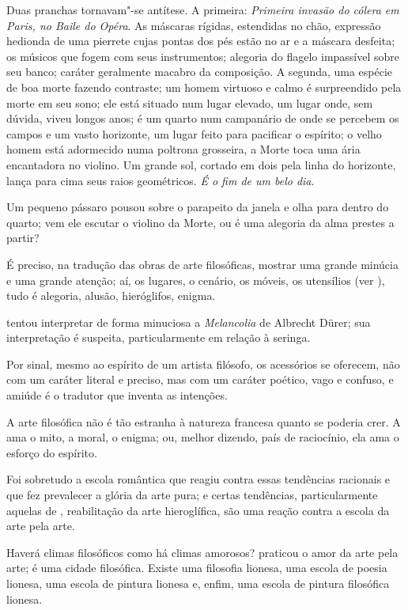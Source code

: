 Duas pranchas tornavam"-se antítese. A primeira: \textit{Primeira invasão
do cólera em Paris, no Baile do Opéra}. As máscaras rígidas, estendidas	
no chão, expressão hedionda de uma pierrete cujas pontas dos pés estão
no ar e a máscara desfeita; os músicos que fogem com seus instrumentos;
alegoria do flagelo impassível sobre seu banco; caráter geralmente
macabro da composição. A segunda, uma espécie de boa morte fazendo
contraste; um homem virtuoso e calmo é surpreendido pela morte em seu
sono; ele está situado num lugar elevado, um lugar onde, sem dúvida,
viveu longos anos; é um quarto num campanário de onde se percebem os
campos e um vasto horizonte, um lugar feito para pacificar o espírito;
o velho homem está adormecido numa poltrona grosseira, a Morte toca uma
ária encantadora no violino. Um grande sol, cortado em dois pela linha
do horizonte, lança para cima seus raios geométricos. \textit{É o fim
de um belo dia}.

Um pequeno pássaro pousou sobre o parapeito da janela e olha para dentro
do quarto; vem ele escutar o violino da Morte, ou é uma alegoria da
alma prestes a partir?

É preciso, na tradução das obras de arte filosóficas, mostrar uma grande
minúcia e uma grande atenção; aí, os lugares, o cenário, os móveis, os
utensílios (ver ), tudo é alegoria, alusão, hieróglifos, enigma.

 tentou interpretar de forma minuciosa a \textit{Melancolia} de
Albrecht Dürer; sua interpretação é suspeita, particularmente em relação
à seringa.

Por sinal, mesmo ao espírito de um artista filósofo, os acessórios se
oferecem, não com um caráter literal e preciso, mas com um caráter
poético, vago e confuso, e amiúde é o tradutor que inventa as
intenções.

A arte filosófica não é tão estranha à natureza francesa quanto se
poderia crer. A  ama o mito, a moral, o enigma; ou, melhor
dizendo, país de raciocínio, ela ama o esforço do espírito.

Foi sobretudo a escola romântica que reagiu contra essas tendências
racionais e que fez prevalecer a glória da arte pura; e certas
tendências, particularmente aquelas de , reabilitação da arte
hieroglífica, são uma reação contra a escola da arte pela arte.

Haverá climas filosóficos como há climas amorosos?  praticou o
amor da arte pela arte;  é uma cidade filosófica. Existe uma
filosofia lionesa, uma escola de poesia lionesa, uma escola de pintura
lionesa e, enfim, uma escola de pintura filosófica lionesa.


